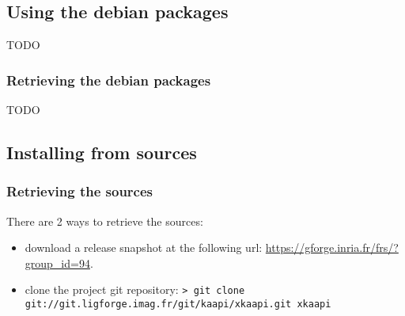 \documentclass{article}
\begin{document}
\subsection{Using the debian packages}
TODO
\subsubsection{Retrieving the debian packages}
TODO

\subsection{Installing from sources}

\subsubsection{Retrieving the sources}
There are 2 ways to retrieve the sources:
\begin{itemize}
\item download a release snapshot at the following url:\newline
\url{https://gforge.inria.fr/frs/?group_id=94}.
\item clone the project git repository:\newline
\verb+> git clone git://git.ligforge.imag.fr/git/kaapi/xkaapi.git xkaapi+
\end{itemize}
\end{document}
